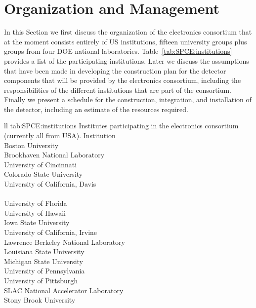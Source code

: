 \section{Organization and Management}
\label{sec:fdsp-tpcelec-management}

In this Section we first discuss the organization of the  electronics
consortium that at the moment consists entirely of US institutions, 
fifteen university groups plus groups from four DOE national 
laboratories. Table~\ref{tab:SPCE:institutions} provides a list 
of the participating institutions.
Later we discuss the assumptions that have been made in developing
the construction plan for the detector components that will be
provided by the  electronics consortium, including the responsibilities
of the different institutions that are part of the consortium. Finally
we present a schedule for the construction, integration, and installation
of the detector, including an estimate of the resources required.


\begin{dunetable}
{ll}
{tab:SPCE:institutions}
{Institutes participating in the  electronics consortium (currently all from USA).}
Institution  \\ \toprowrule
Boston University \\ \colhline
Brookhaven National Laboratory \\ \colhline
University of Cincinnati \\ \colhline
Colorado State University  \\ \colhline
University of California, Davis \\ \colhline
{} \\ \colhline
University of Florida \\ \colhline
University of Hawaii \\ \colhline
Iowa State University \\ \colhline
University of California, Irvine \\ \colhline
Lawrence Berkeley National Laboratory \\ \colhline
Louisiana State University \\ \colhline
Michigan State University \\ \colhline
University of Pennsylvania \\ \colhline
University of Pittsburgh \\ \colhline
SLAC National Accelerator Laboratory \\ \colhline
Stony Brook University \\
\end{dunetable}

